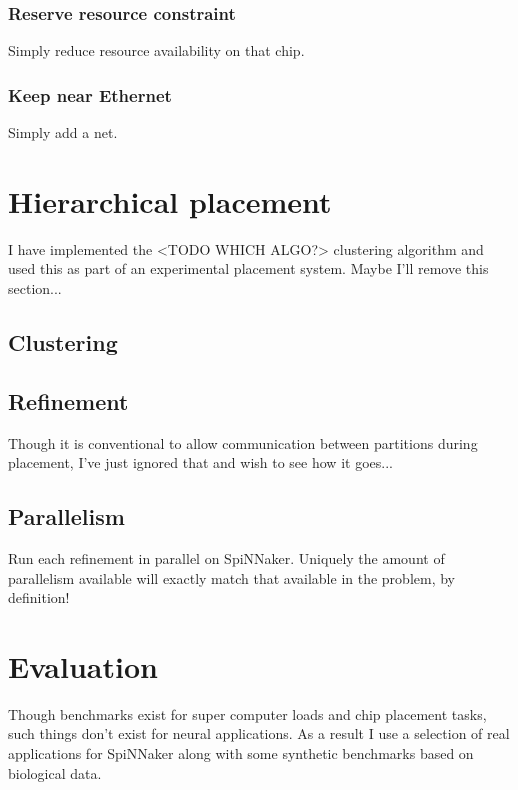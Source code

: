 			\subsubsection{Reserve resource constraint}
				
				Simply reduce resource availability on that chip.
			
			\subsubsection{Keep near Ethernet}
				
				Simply add a net.
	
	\section{Hierarchical placement}
		
		I have implemented the <TODO WHICH ALGO?> clustering algorithm and used
		this as part of an experimental placement system. Maybe I'll remove this
		section...
		
		\subsection{Clustering}
		
		\subsection{Refinement}
			
			Though it is conventional to allow communication between partitions
			during placement, I've just ignored that and wish to see how it goes...
		
		\subsection{Parallelism}
			
			Run each refinement in parallel on SpiNNaker. Uniquely the amount of
			parallelism available will exactly match that available in the problem,
			by definition!
	
	\section{Evaluation}
		
		Though benchmarks exist for super computer loads and chip placement tasks,
		such things don't exist for neural applications. As a result I use a
		selection of real applications for SpiNNaker along with some synthetic
		benchmarks based on biological data.
		
